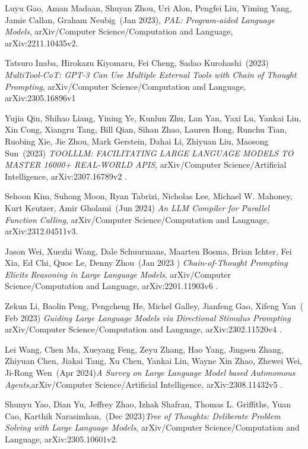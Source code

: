 \documentclass[conference]{IEEEtran}
\begin{document}
\begin{thebibliography}{00}
    Luyu Gao, Aman Madaan, Shuyan Zhou, Uri Alon, Pengfei Liu, Yiming Yang, Jamie Callan, Graham Neubig~(Jan 2023), 
    {\it PAL: Program-aided Language Models}, 
    arXiv/Computer Science/Computation and Language,
     arXiv:2211.10435v2.
    
    Tatsuro Inaba, Hirokazu Kiyomaru, Fei Cheng, Sadao Kurohashi~(2023)
    {\it MultiTool-CoT: GPT-3 Can Use Multiple External Tools with Chain of
    Thought Prompting}, arXiv/Computer Science/Computation and Language,
     arXiv:2305.16896v1
    
    Yujia Qin, Shihao Liang, Yining Ye, Kunlun Zhu, Lan Yan, Yaxi Lu, Yankai Lin, Xin Cong, Xiangru Tang, Bill Qian, Sihan Zhao, Lauren Hong, Runchu Tian, Ruobing Xie, Jie Zhou, Mark Gerstein, Dahai Li, Zhiyuan Liu, Maosong Sun~(2023)
    {\it TOOLLLM: FACILITATING LARGE LANGUAGE
    MODELS TO MASTER 16000+ REAL-WORLD APIS}, arXiv/Computer Science/Artificial Intelligence,
    arXiv:2307.16789v2 
    .
    
    Sehoon Kim, Suhong Moon, Ryan Tabrizi, Nicholas Lee, Michael W. Mahoney, Kurt Keutzer, Amir Gholami~(Jun 2024) 
    {\it An LLM Compiler for Parallel Function Calling},
    arXiv/Computer Science/Computation and Language,
    arXiv:2312.04511v3.
    
    Jason Wei, Xuezhi Wang, Dale Schuurmans, Maarten Bosma, Brian Ichter, Fei Xia, Ed Chi, Quoc Le, Denny Zhou~(Jan 2023 )
    {\it Chain-of-Thought Prompting Elicits Reasoning
    in Large Language Models}, arXiv/Computer Science/Computation and Language,
    arXiv:2201.11903v6 .
    
    Zekun Li, Baolin Peng, Pengcheng He, Michel Galley, Jianfeng Gao, Xifeng Yan~( Feb 2023)
    {\it Guiding Large Language Models via
    Directional Stimulus Prompting} 
    arXiv/Computer Science/Computation and Language,  arXiv:2302.11520v4 .
    
    
    Lei Wang, Chen Ma, Xueyang Feng, Zeyu Zhang, Hao Yang, Jingsen Zhang, Zhiyuan Chen, Jiakai Tang, Xu Chen, Yankai Lin, Wayne Xin Zhao, Zhewei Wei, Ji-Rong Wen~(Apr 2024){\it A Survey on Large Language Model based Autonomous
    Agents},arXiv/Computer Science/Artificial Intelligence, arXiv:2308.11432v5 .
    
    Shunyu Yao, Dian Yu, Jeffrey Zhao, Izhak Shafran, Thomas L. Griffiths, Yuan Cao, Karthik Narasimhan,~(Dec 2023){\it Tree of Thoughts: Deliberate Problem Solving
    with Large Language Models}, arXiv/Computer Science/Computation and Language,  arXiv:2305.10601v2.
    

\end{thebibliography}
\end{document}
